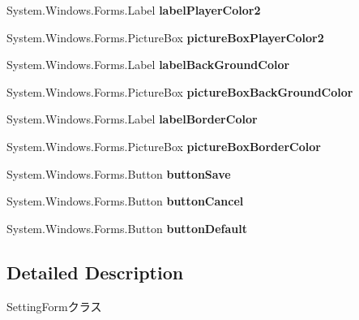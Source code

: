 \begin{DoxyCompactItemize}
System.\+Windows.\+Forms.\+Label {\bfseries label\+Player\+Color2}
\item 
\mbox{\label{class_reversi_form_1_1_setting_form_a4548670b3cb0e502b7a7bb034e04c4cc}} 
System.\+Windows.\+Forms.\+Picture\+Box {\bfseries picture\+Box\+Player\+Color2}
\item 
\mbox{\label{class_reversi_form_1_1_setting_form_ad643a33788587666f27b6c27914ac641}} 
System.\+Windows.\+Forms.\+Label {\bfseries label\+Back\+Ground\+Color}
\item 
\mbox{\label{class_reversi_form_1_1_setting_form_a9af0137a43dcd7b347aaff5f0b3cdc74}} 
System.\+Windows.\+Forms.\+Picture\+Box {\bfseries picture\+Box\+Back\+Ground\+Color}
\item 
\mbox{\label{class_reversi_form_1_1_setting_form_a7920f5498175381a4a486821dcc9e884}} 
System.\+Windows.\+Forms.\+Label {\bfseries label\+Border\+Color}
\item 
\mbox{\label{class_reversi_form_1_1_setting_form_a883394d10899204936ab19201b1d19da}} 
System.\+Windows.\+Forms.\+Picture\+Box {\bfseries picture\+Box\+Border\+Color}
\item 
\mbox{\label{class_reversi_form_1_1_setting_form_ad5d8ed953d9b9f56fae6384ebce852c5}} 
System.\+Windows.\+Forms.\+Button {\bfseries button\+Save}
\item 
\mbox{\label{class_reversi_form_1_1_setting_form_ad0cdce792a1080ba5cb345b407f1b0b9}} 
System.\+Windows.\+Forms.\+Button {\bfseries button\+Cancel}
\item 
\mbox{\label{class_reversi_form_1_1_setting_form_a033795263124be199d089504847d6e27}} 
System.\+Windows.\+Forms.\+Button {\bfseries button\+Default}
\end{DoxyCompactItemize}


\subsection{Detailed Description}
Setting\+Formクラス 

